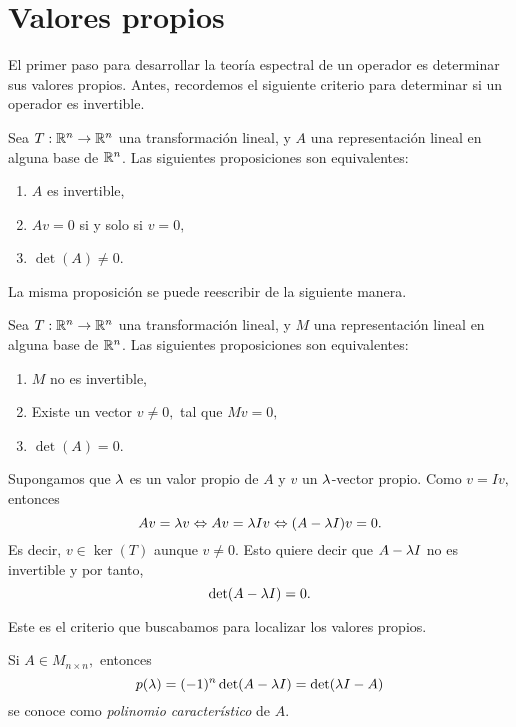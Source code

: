 \section{Valores propios}

 El primer paso para desarrollar la teoría espectral de un operador es determinar sus valores
propios. Antes, recordemos el siguiente criterio para determinar si un operador es invertible.

\begin{proposicion}
 Sea $T:\mathbb{R}^{n}\to \mathbb{R}^{n}$ una transformación lineal, y $A$ una representación lineal en alguna base de $\mathbb{R}^{n}$. Las
siguientes proposiciones son equivalentes:
\begin{enumerate}
 \item $A$ es invertible,
 \item $Av=0$ si y solo si $v=0,$
 \item $\det(A)\neq 0$.
\end{enumerate}
\end{proposicion}

La misma proposición se puede reescribir de la siguiente manera.

\begin{proposicion}
 Sea $T:\mathbb{R}^{n}\to \mathbb{R}^{n}$ una transformación lineal, y $M$ una representación lineal en alguna base de $\mathbb{R}^{n}$. Las
siguientes proposiciones son equivalentes:
\begin{enumerate}
 \item $M$ no es invertible,
 \item Existe un vector $v\neq 0,$ tal que $Mv=0,$
 \item $\det(A)= 0$.
\end{enumerate}
\end{proposicion}



Supongamos que $\lambda$ es un valor propio de $A$ y $v$ un $\lambda$-vector propio. Como $v = Iv,$ entonces
$$
Av=\lambda v \Leftrightarrow Av=\lambda Iv \Leftrightarrow (A-\lambda I)v=0.
$$
Es decir, $v\in \ker(T)$ aunque $v\neq 0.$ Esto quiere decir que $A-\lambda I$ no es invertible y por tanto,
$$
\det(A-\lambda I)=0.
$$

Este es el criterio que buscabamos para localizar los valores propios.

\begin{definicion}
 Si $A\in M_{n\times n},$ entonces
 $$
p(\lambda)=(-1)^{n}\det(A-\lambda I)=\det(\lambda I - A)
 $$
 se conoce como \emph{polinomio característico} de $A.$
\end{definicion}

